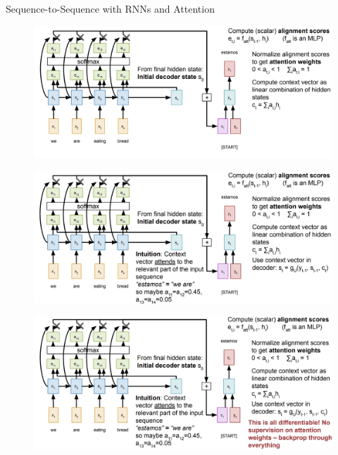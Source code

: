 \begin{frame}[allowframebreaks]{Sequence-to-Sequence with RNNs and Attention}
\framebreak
    \begin{figure}
    \centering
    \includegraphics[width=1.0\textwidth,height=1.0\textheight,keepaspectratio]{images/advanced-cv/attention_4.png}
    \end{figure}  
\framebreak
    \begin{figure}
    \centering
    \includegraphics[width=1.0\textwidth,height=1.0\textheight,keepaspectratio]{images/advanced-cv/attention_5.png}
    \end{figure}  
\framebreak
    \begin{figure}
    \centering
    \includegraphics[width=1.0\textwidth,height=1.0\textheight,keepaspectratio]{images/advanced-cv/attention_6.png}
    \end{figure}  
\framebreak
    \begin{figure}

\end{figure}
\end{frame}
